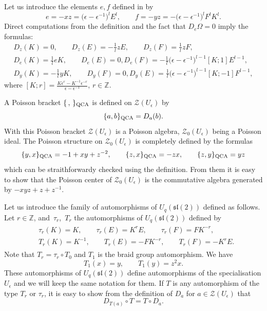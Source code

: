\documentclass[pdftex]{sigma}%
\numberwithin{equation}{section}
\numberwithin{figure}{section}
\newcommand{\e}{\epsilon}
\begin{document}
Let us introduce the elements $e,f$ defined in \cite{DC-K} by
\begin{equation}\label{efdef}
e=-xz=\big(\e-\e^{-1}\big)^{l}E^l,\qquad
f=-yz = -\big(\e-\e^{-1}\big)^{l}F^lK^l.
\end{equation}
Direct computations from the definition and the fact that $D_e \Omega =0$ imply the formulas:
\begin{gather}\label{derform2}
D_z(K)= 0, \qquad D_z(E) = -\frac{1}{l}zE,\qquad D_z(F) = \frac{1}{l}zF,
\\
\label{derform3}
D_e(K)=\frac{1}{l}eK,\qquad D_e(E) =0, D_e(F) =- \frac{1}{l}\big(\e-\e^{-1}\big)^{l-1}[K;1]E^{l-1},
\\
\label{derform4}
D_y(K)=-\frac{1}{l}yK,\qquad D_y(F) =0, D_y(E) = \frac{1}{l}\big(\e-\e^{-1}\big)^{l-1}[K;-1]F^{l-1},
\end{gather}
where $[K;r] = \frac{K\e^r-K^{-1}\e^{-r}}{\e-\e^{-1}}$, $r\in {\mathbb Z}$.

\smallskip
A Poisson bracket $\{\, ,\, \}_{\rm QCA}$ is defined on $\mathcal{Z}(U_\epsilon)$ by
\[
\{a,b\}_{\rm QCA}= D_a(b).
\]
With this Poisson bracket $\mathcal{Z}(U_\epsilon)$ is a Poisson algebra, $\mathcal{Z}_0(U_\epsilon)$ being a Poisson ideal.
The Poisson structure on $\mathcal{Z}_0(U_\epsilon)$ is completely defined by the formulas
\begin{equation}\label{bracketQCA}
\{y,x\} _{\rm QCA}= -1+xy+z^{-2},\qquad \{z,x\}_{\rm QCA} = -zx,\qquad \{z,y\}_{\rm QCA} = yz
\end{equation}
which can be straithforwardy checked using the definition. From them it is easy to show that the Poisson center of $\mathcal{Z}_0(U_\epsilon)$ is the commutative algebra generated by $-xyz+z+z^{-1}.$

Let us introduce the family of automorphisms of $U_q({\mathfrak{sl}}(2))$ defined as follows. Let $r\in \mathbb Z$, and~$\tau_r$,~$T_r$ the automorphisms of $U_q({\mathfrak{sl}}(2))$ defined by
\begin{gather*}
\begin{split}
&\tau_r(K)=K,\qquad \tau_r(E)=K^r E,\qquad \tau_r(F)=FK^{-r},\\
&T_r(K)=K^{-1},\qquad T_r(E)=-FK^{-r},\qquad T_r(F)=-K^r E.
\end{split}
\end{gather*}
Note that $T_r=\tau_r\circ T_0$ and $T_1$ is the braid group automorphism. We have
\[
T_1(x)=y,\qquad T_1(y)=z^2 x.
\]
These automorphisms of $U_q({\mathfrak{sl}}(2))$ define automorphisms of the specialisation $U_\epsilon$ and we will keep the same notation for them. If $T$ is any automorphism of the type $T_r$ or $\tau_r$, it is easy to show from the definition of $D_a$ for $a \in {\mathcal Z}(U_\epsilon)$ that
\[
D_{T(a)}\circ T=T\circ D_a.
\]
\end{document}
